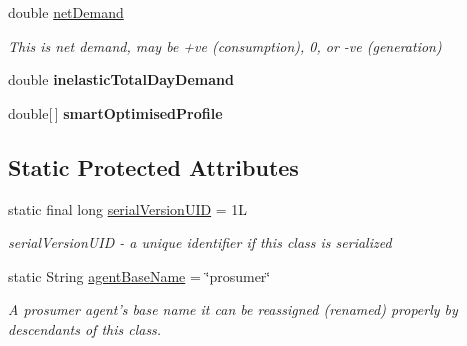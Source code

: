 \begin{DoxyCompactItemize}
\item 
double \hyperlink{classuk_1_1ac_1_1dmu_1_1iesd_1_1cascade_1_1agents_1_1prosumers_1_1_prosumer_agent_af17266e09c606c54fb838282138b92a4}{net\-Demand}
\begin{DoxyCompactList}\small\item\em This is net demand, may be +ve (consumption), 0, or -\/ve (generation) \end{DoxyCompactList}\item 
\hypertarget{classuk_1_1ac_1_1dmu_1_1iesd_1_1cascade_1_1agents_1_1prosumers_1_1_prosumer_agent_aaadbb4240cee3ac7a0392507ab00e896}{double {\bfseries inelastic\-Total\-Day\-Demand}}\label{classuk_1_1ac_1_1dmu_1_1iesd_1_1cascade_1_1agents_1_1prosumers_1_1_prosumer_agent_aaadbb4240cee3ac7a0392507ab00e896}

\item 
\hypertarget{classuk_1_1ac_1_1dmu_1_1iesd_1_1cascade_1_1agents_1_1prosumers_1_1_prosumer_agent_a697117e3580fa4287d8936fc09c47969}{double\mbox{[}$\,$\mbox{]} {\bfseries smart\-Optimised\-Profile}}\label{classuk_1_1ac_1_1dmu_1_1iesd_1_1cascade_1_1agents_1_1prosumers_1_1_prosumer_agent_a697117e3580fa4287d8936fc09c47969}

\end{DoxyCompactItemize}
\subsection*{Static Protected Attributes}
\begin{DoxyCompactItemize}
\item 
\hypertarget{classuk_1_1ac_1_1dmu_1_1iesd_1_1cascade_1_1agents_1_1prosumers_1_1_prosumer_agent_a85df0dd2d9532c6ceb7b50df59119730}{static final long \hyperlink{classuk_1_1ac_1_1dmu_1_1iesd_1_1cascade_1_1agents_1_1prosumers_1_1_prosumer_agent_a85df0dd2d9532c6ceb7b50df59119730}{serial\-Version\-U\-I\-D} = 1\-L}\label{classuk_1_1ac_1_1dmu_1_1iesd_1_1cascade_1_1agents_1_1prosumers_1_1_prosumer_agent_a85df0dd2d9532c6ceb7b50df59119730}

\begin{DoxyCompactList}\small\item\em serial\-Version\-U\-I\-D -\/ a unique identifier if this class is serialized \end{DoxyCompactList}\item 
\hypertarget{classuk_1_1ac_1_1dmu_1_1iesd_1_1cascade_1_1agents_1_1prosumers_1_1_prosumer_agent_a8c66e8d47a309858469bc0490488eaba}{static String \hyperlink{classuk_1_1ac_1_1dmu_1_1iesd_1_1cascade_1_1agents_1_1prosumers_1_1_prosumer_agent_a8c66e8d47a309858469bc0490488eaba}{agent\-Base\-Name} = \char`\"{}prosumer\char`\"{}}\label{classuk_1_1ac_1_1dmu_1_1iesd_1_1cascade_1_1agents_1_1prosumers_1_1_prosumer_agent_a8c66e8d47a309858469bc0490488eaba}

\begin{DoxyCompactList}\small\item\em A prosumer agent's base name it can be reassigned (renamed) properly by descendants of this class. \end{DoxyCompactList}\end{DoxyCompactItemize}


